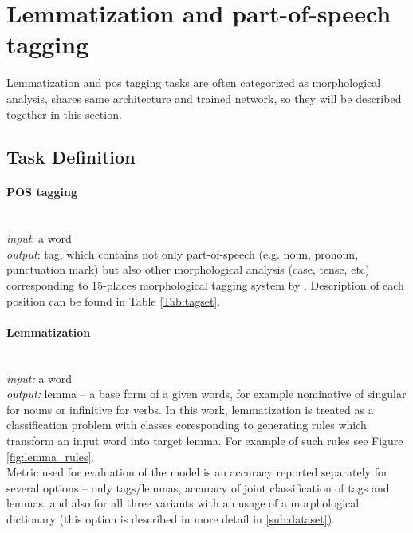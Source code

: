 \section{Lemmatization and part-of-speech tagging}
\label{chap:tag}
Lemmatization and \acrlong{pos} tagging tasks are often categorized as morphological analysis, shares same architecture and trained network, so they will be described together in this section.
\subsection{Task Definition}

\paragraph{\textbf{POS tagging}} \mbox{}\\
\textit{input}: a word \\
\textit{output}: tag, which contains not only part-of-speech (e.g. noun, pronoun, punctuation mark) but also other morphological analysis (case, tense, etc) corresponding to 15-places morphological tagging system by \cite{Hajic2004}. Description of each position can be found in Table \ref{Tab:tagset}.

\paragraph{\textbf{Lemmatization}} \mbox{}\\
\textit{input:} a word \\
\textit{output:} lemma -- a base form of a given words, for example nominative of singular for nouns or infinitive for verbs. In this work, lemmatization is treated as a classification problem with classes coresponding to generating rules which transform an input word into target lemma. For example of such rules see Figure \ref{fig:lemma_rules}. \\ %


Metric used for evaluation of the model is an accuracy reported separately for several options -- only tags/lemmas, accuracy of joint classification of tags and lemmas, and  also for all three variants with an usage of a morphological dictionary (this option is described in more detail in \ref{sub:dataset}).

